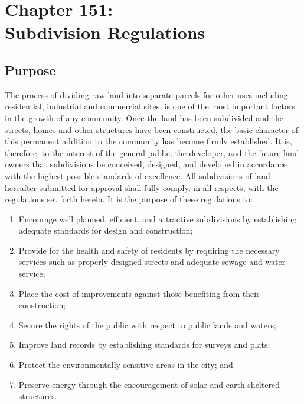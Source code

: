 \chapter*{Chapter 151: \\
	Subdivision Regulations}
    \vfill
    \minitoc
    \pagebreak


\section{Purpose}
The process of dividing raw land into separate parcels for other uses including residential, industrial and commercial sites, is one of the most important factors in the growth of any community. Once the land has been subdivided and the streets, homes and other structures have been constructed, the basic character of this permanent addition to the community has become firmly established. It is, therefore, to the interest of the general public, the developer, and the future land owners that subdivisions be conceived, designed, and developed in accordance with the highest possible standards of excellence. All subdivisions of land hereafter submitted for approval shall fully comply, in all respects, with the regulations set forth herein. It is the purpose of these regulations to:
\begin{enumerate}[{\indent}A)]
    \item Encourage well planned, efficient, and attractive subdivisions by establishing adequate standards for design and construction; 
    \item Provide for the health and safety of residents by requiring the necessary services such as properly designed streets and adequate sewage and water service; 
    \item Place the cost of improvements against those benefiting from their construction; 
    \item Secure the rights of the public with respect to public lands and waters; 
    \item Improve land records by establishing standards for surveys and plats; 
    \item Protect the environmentally sensitive areas in the city; and 
    \item Preserve energy through the encouragement of solar and earth-sheltered structures.
\end{enumerate}

